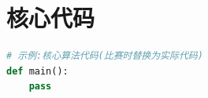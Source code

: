 
\section{核心代码}

\begin{lstlisting}[language=python]
# 示例:核心算法代码(比赛时替换为实际代码)
def main():
    pass
\end{lstlisting}

